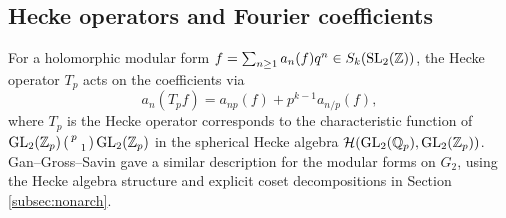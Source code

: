 \subsection{Hecke operators and Fourier coefficients}
\label{subsec:g2heckefourier}

For a holomorphic modular form $f = \sum_{n \ge 1} a_n(f) q^n \in S_k(\mathrm{SL}_2(\mathbb{Z}))$, the Hecke operator $T_p$ acts on the coefficients via
$$
a_n(T_p f) = a_{np}(f) + p^{k-1} a_{n/p}(f),
$$
where $T_p$ is the Hecke operator corresponds to the characteristic function of $\mathrm{GL}_2(\mathbb{Z}_p) \left(\begin{smallmatrix}
    p & \\ & 1
\end{smallmatrix}\right) \mathrm{GL}_2(\mathbb{Z}_p)$ in the spherical Hecke algebra $\mathcal{H}(\mathrm{GL}_2(\mathbb{Q}_p), \mathrm{GL}_2(\mathbb{Z}_p))$.
Gan--Gross--Savin \cite{gan2002fourier} gave a similar description for the modular forms on $G_2$, using the Hecke algebra structure and explicit coset decompositions in Section \ref{subsec:nonarch}.


